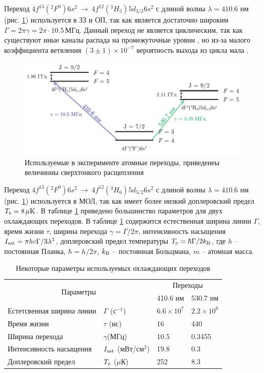 




Переход $4f^{13}({}^2F^0)6 s^2 \ \to\ 4f^{12}({}^3H_5)5d_{3/2}6s^2$ с длиной волны $\lambda = 410.6$ нм (рис. \ref{fig:Tm}) используется в ЗЗ и ОП, так как является достаточно широким $\Gamma = 2 \pi \gamma = 2\pi \cdot 10.5\, \text{МГц}$. Данный переход не является циклическим, так как существуют иные каналы распада на промежуточные уровни \cite{vlad}, но из-за малого коэффициента ветвления $(3\pm1)\times 10^{-7}$ вероятность выхода из цикла мала \cite{Kolachevsky2007}.


\begin{figure}[h]
    \centering
    \includegraphics{figs/tm.pdf}
    \caption{Используемые в эксперименте атомные переходы, приведенеы величиниы сверхтонкого расщепления \cite{Kolachevsky2007}}
    \label{fig:Tm}
\end{figure}


Переход $4f^{13}({}^2F^0)6 s^2 \ \to\ 4f^{12}({}^3H_6)5d_{5/2}6s^2$ с длиной волны $\lambda = 410.6$ нм (рис. \ref{fig:Tm}) используется в МОЛ, так как имеет более низкий доплеровский предел  $\subt{T}{D} = 8\, \mu\text{K}$. В таблице \ref{tab:tm} приведено большинство параметров для двух охлаждающих переходов. В таблице \ref{tab:tm} содержится естественная ширина линии $\Gamma$, время жизни $\tau$, ширина перехода $\gamma = \Gamma / 2\pi$, интенсивность насыщения $I_{\textnormal{sat}} = \pi h c \Gamma / 3 \lambda^3$, доплеровский предел температуры $\subt{T}{D} = \hbar \Gamma / 2 \kB$, где $h$ -- постоянная Планка, $\hbar = h / 2\pi$, $k_{\textnormal{B}}$ -- постоянная Больцмана, $m$ -- атомная масса.

\begin{table}[h]
	\caption{Некоторые параметры используемых охлаждающих переходов}
	\label{tab:tm}
	\centering
	\begin{tabular}{ll|ll}
	\toprule
	\multicolumn{2}{c}{\multirow{2}{*}{Параметры}} & \multicolumn{2}{c}{Переходы} \\
	&& 410.6 нм &  530.7 нм \\
	\midrule
	Естетсвенная ширина линии & $\Gamma$ (с${}^{-1}$) & $6.6 \times 10^7$ & $2.2 \times 10^6$ \\
	Время жизни & $\tau$ (нс) & 16 & 440 \\
	Ширина перехода  & $\gamma$(МГц) & 10.5 & 0.3455 \\
	Интенсивность насыщения & $I_{\textnormal{sat}}$ (мВт/см${}^2$) & 19.8 & 0.3 \\
	Доплеровский предел & $\subt{T}{D}$ ($\mu$К) & 252 & 8.3 \\
	\bottomrule
	\end{tabular}
\end{table}


% 	